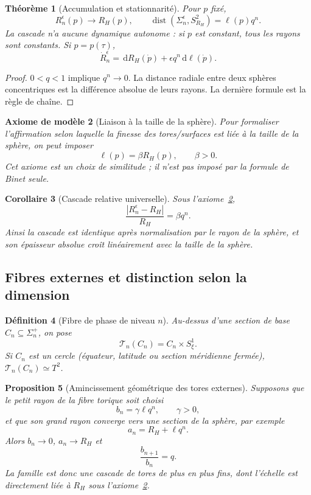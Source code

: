 \documentclass[11pt,a4paper]{article}
\newtheorem{theorem}{Théorème}[section]
\newtheorem{proposition}[theorem]{Proposition}
\newtheorem{corollary}[theorem]{Corollaire}
\newtheorem{definition}[theorem]{Définition}
\newtheorem{axiom}[theorem]{Axiome de modèle}
\newcommand{\dd}{\,\mathrm d}
\newcommand{\dist}{\operatorname{dist}}
\begin{document}
\begin{theorem}[Accumulation et stationnarité]\label{thm:upperacc}
Pour $p$ fixé,
\[
 R_n^\epsilon(p)\to R_H(p),\qquad
 \dist(\Sigma_n^\epsilon,S^2_{R_H})=\ell(p)q^n.
\]
La cascade n'a aucune dynamique autonome : si $p$ est constant, tous les rayons sont constants. Si $p=p(\tau)$,
\[
 \dot R_n^\epsilon=\dd R_H(\dot p)+\epsilon q^n\dd\ell(\dot p).
\]
\end{theorem}

\begin{proof}
$0<q<1$ implique $q^n\to0$. La distance radiale entre deux sphères concentriques est la différence absolue de leurs rayons. La dernière formule est la règle de chaîne.
\end{proof}

\begin{axiom}[Liaison à la taille de la sphère]\label{ax:scale}
Pour formaliser l'affirmation selon laquelle la finesse des tores/surfaces est liée à la taille de la sphère, on peut imposer
\[
 \ell(p)=\beta R_H(p),\qquad \beta>0.
\]
Cet axiome est un choix de similitude ; il n'est pas imposé par la formule de Binet seule.
\end{axiom}

\begin{corollary}[Cascade relative universelle]
Sous l'axiome~\ref{ax:scale},
\[
 \frac{|R_n^\epsilon-R_H|}{R_H}=\beta q^n.
\]
Ainsi la cascade est identique après normalisation par le rayon de la sphère, et son épaisseur absolue croît linéairement avec la taille de la sphère.
\end{corollary}

\subsection{Fibres externes et distinction selon la dimension}

\begin{definition}[Fibre de phase de niveau $n$]
Au-dessus d'une section de base $C_n\subseteq\Sigma_n^+$, on pose
\[
 \mathcal T_n(C_n)=C_n\times S^1_\xi.
\]
Si $C_n$ est un cercle (équateur, latitude ou section méridienne fermée), $\mathcal T_n(C_n)\simeq T^2$.
\end{definition}

\begin{proposition}[Amincissement géométrique des tores externes]
Supposons que le petit rayon de la fibre torique soit choisi
\[
 b_n=\gamma\ell q^n,\qquad \gamma>0,
\]
et que son grand rayon converge vers une section de la sphère, par exemple
\[
 a_n=R_H+\ell q^n.
\]
Alors $b_n\to0$, $a_n\to R_H$ et
\[
 \frac{b_{n+1}}{b_n}=q.
\]
La famille est donc une cascade de tores de plus en plus fins, dont l'échelle est directement liée à $R_H$ sous l'axiome~\ref{ax:scale}.
\end{proposition}
\end{document}
